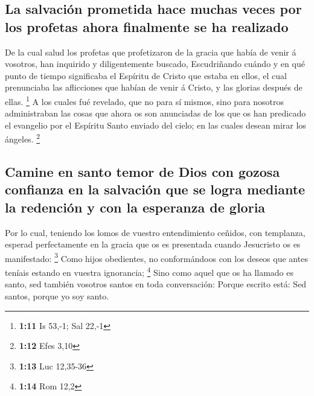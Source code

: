 \hypertarget{la-salvaciuxf3n-prometida-hace-muchas-veces-por-los-profetas-ahora-finalmente-se-ha-realizado}{%
\subsection{La salvación prometida hace muchas veces por los profetas
ahora finalmente se ha
realizado}\label{la-salvaciuxf3n-prometida-hace-muchas-veces-por-los-profetas-ahora-finalmente-se-ha-realizado}}

 De la cual salud los profetas que profetizaron de la
gracia que había de venir á vosotros, han inquirido y diligentemente
buscado,  Escudriñando cuándo y en qué punto de tiempo
significaba el Espíritu de Cristo que estaba en ellos, el cual
prenunciaba las aflicciones que habían de venir á Cristo, y las glorias
después de ellas. \footnote{\textbf{1:11} Is 53,-1; Sal 22,-1}
 A los cuales fué revelado, que no para sí mismos, sino
para nosotros administraban las cosas que ahora os son anunciadas de los
que os han predicado el evangelio por el Espíritu Santo enviado del
cielo; en las cuales desean mirar los ángeles. \footnote{\textbf{1:12}
  Efes 3,10}

\hypertarget{camine-en-santo-temor-de-dios-con-gozosa-confianza-en-la-salvaciuxf3n-que-se-logra-mediante-la-redenciuxf3n-y-con-la-esperanza-de-gloria}{%
\subsection{Camine en santo temor de Dios con gozosa confianza en la
salvación que se logra mediante la redención y con la esperanza de
gloria}\label{camine-en-santo-temor-de-dios-con-gozosa-confianza-en-la-salvaciuxf3n-que-se-logra-mediante-la-redenciuxf3n-y-con-la-esperanza-de-gloria}}

 Por lo cual, teniendo los lomos de vuestro entendimiento
ceñidos, con templanza, esperad perfectamente en la gracia que os es
presentada cuando Jesucristo os es manifestado: \footnote{\textbf{1:13}
  Luc 12,35-36}  Como hijos obedientes, no conformándoos
con los deseos que antes teníais estando en vuestra ignorancia;
\footnote{\textbf{1:14} Rom 12,2}  Sino como aquel que os
ha llamado es santo, sed también vosotros santos en toda conversación:
 Porque escrito está: Sed santos, porque yo soy santo.

